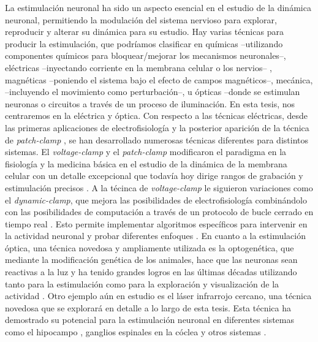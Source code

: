 La estimulación neuronal ha sido un aspecto esencial en el estudio de la dinámica neuronal, permitiendo la modulación del sistema nervioso para explorar, reproducir y alterar su dinámica para su estudio. Hay varias técnicas para producir la estimulación, que podríamos clasificar en químicas --utilizando componentes químicos para bloquear/mejorar los mecanismos neuronales--, eléctricas --inyectando corriente en la membrana celular o los nervios-- , magnéticas --poniendo el sistema bajo el efecto de campos magnéticos--, mecánica, --incluyendo el movimiento como perturbación--, u ópticas --donde se estimulan neuronas o circuitos a través de un proceso de iluminación. En esta tesis, nos centraremos en la eléctrica y óptica. Con respecto a las técnicas eléctricas, desde las primeras aplicaciones de electrofisiología \parencite{marmont_studies_1949,cole_ions_1955,neher_singlechannel_1976} y la posterior aparición de la técnica de \textit{patch-clamp} \textcite{hamill_improved_1981}, se han desarrollado numerosas técnicas diferentes para distintos sistemas. El \textit{voltage-clamp }y el \textit{patch-clamp} modificaron el paradigma en la fisiología y la medicina básica en el estudio de la dinámica de la membrana celular con un detalle excepcional que todavía hoy dirige rangos de grabación y estimulación precisos \parencite{hamill_improved_1981}. A la técinca de \textit{voltage-clamp} le siguieron variaciones como el \textit{dynamic-clamp}, que mejora las posibilidades de electrofisiología combinándolo con las posibilidades de computación a través de un protocolo de bucle cerrado en tiempo real \parencite{nowotny_dynamic_2022}. Esto permite implementar algoritmos específicos para intervenir en la actividad neuronal y probar diferentes enfoques \parencite{chamorro_generalization_2012}. En cuanto a la estimulación óptica, una técnica novedosa y ampliamente utilizada es la optogenética, que mediante la modificación genética de los animales, hace que las neuronas sean reactivas a la luz y ha tenido grandes logros en las últimas décadas utilizando tanto para la estimulación como para la exploración y visualización de la actividad \parencite{chen_roles_2022}. Otro ejemplo aún en estudio es el láser infrarrojo cercano, una técnica novedosa que se explorará en detalle a lo largo de esta tesis. Esta técnica ha demostrado su potencial para la estimulación neuronal en diferentes sistemas como el hipocampo \parencite{liang_temperaturedependent_2009}, ganglios espinales en la cóclea \parencite{goyal_acute_2012, barrett_pulsed_2018, brown_thermal_2020} y otros sistemas \parencite{shapiro_infrared_2012, cayce_infrared_2014, begeng_activity_2022}.

